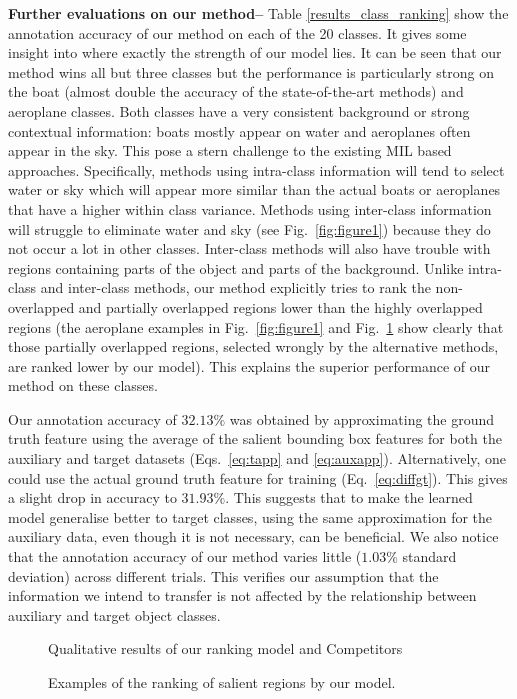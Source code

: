 \documentclass{bmvc2k}
\begin{document}
\noindent \textbf{Further evaluations on our method--} Table \ref{results_class_ranking} show the annotation accuracy of our method on each of the 20 classes. It gives some insight into where exactly the strength of our model lies. It can be seen that our method wins all but three classes but the performance is particularly strong on the boat (almost double the accuracy of the state-of-the-art methods) and aeroplane classes. Both classes have a very consistent background or strong contextual information: boats mostly appear on water and aeroplanes often appear in the sky. This pose a stern challenge to the existing MIL based approaches. Specifically, methods using intra-class information will tend to select water or sky which will appear more similar than the actual boats or aeroplanes that have a higher within class variance. Methods using inter-class information will struggle to eliminate water and sky (see Fig.~\ref{fig:figure1}) because they do not occur a lot in other classes. Inter-class methods will also have trouble with regions containing parts of the object and parts of the background. Unlike intra-class and inter-class methods, our method explicitly tries to rank the non-overlapped and partially overlapped regions lower than the highly overlapped regions (the aeroplane examples in Fig.~\ref{fig:figure1} and Fig.~\ref{fig:figure2} show clearly that those partially overlapped regions, selected wrongly by the alternative methods, are ranked lower by our model). This explains the superior performance of our method on these classes. 



Our annotation accuracy of $32.13\%$ was obtained by approximating the ground truth feature using the average of the salient bounding box features for both the auxiliary and target datasets (Eqs.~\ref{eq:tapp} and \ref{eq:auxapp}). Alternatively, one could use the actual ground truth feature for training (Eq.~\ref{eq:diffgt}). This gives a slight drop in accuracy to $31.93\%$. This suggests that to make the learned model generalise better to  target classes, using the same approximation for the auxiliary data, even though it is not necessary, can be beneficial. We also notice that the annotation accuracy of our method varies little ($1.03\%$ standard deviation) across different trials. This verifies our assumption that the information we intend to transfer is not affected by the relationship between auxiliary and target object classes.




\begin{figure}[ht]
\begin{minipage}[b]{6cm}
\centering
{}
\caption{Qualitative results of our ranking model and Competitors}
\label{fig:figure1}
\end{minipage}
\hspace{0.7cm}
\begin{minipage}[b]{5cm}
\centering
{}
\caption{Examples of the ranking of salient regions by our model.}
\label{fig:figure2}
\end{minipage}
\end{figure}
\end{document}
